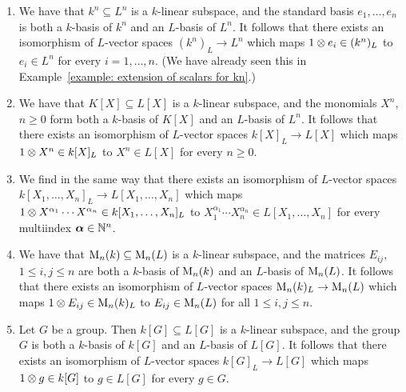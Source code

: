 \begin{example}
  \label{example: recognizing extension of scalar}
  \leavevmode
  \begin{enumerate}
    \item
      We have that $k^n \subseteq L^n$ is a $k$-linear subspace, and the standard basis $e_1, \dotsc, e_n$ is both a $k$-basis of $k^n$ and an $L$-basis of $L^n$.
      It follows that there exists an isomorphism of $L$-vector spaces $(k^n)_L \to L^n$ which maps $1 \mathbin{\otimes} e_i \in (k^n)_L$ to $e_i \in L^n$ for every $i = 1, \dotsc, n$.
      (We have already seen this in Example~\ref{example: extension of scalars for kn}.)
    \item
      We have that $K[X] \subseteq L[X]$ is a $k$-linear subspace, and the monomials $X^n$, $n \geq 0$ form both a $k$-basis of $K[X]$ and an $L$-basis of $L^n$.
      It follows that there exists an isomorphism of $L$-vector spaces $k[X]_L \to L[X]$ which maps $1 \mathbin{\otimes} X^n \in k[X]_L$ to $X^n \in L[X]$ for every $n \geq 0$.
    \item
      We find in the same way that there exists an isomorphism of $L$-vector spaces $k[X_1, \dotsc, X_n]_L \to L[X_1, \dotsc, X_n]$ which maps $1 \mathbin{\otimes} X^{\alpha_1} \dotsm X^{\alpha_n} \in k[X_1, \dotsc, X_n]_L$ to $X_1^{\alpha_1} \dotsm X_n^{\alpha_n} \in L[X_1, \dotsc, X_n]$ for every multiindex $\bm{\alpha} \in \mathbb{N}^n$.
    \item
      We have that $\operatorname{M}_n(k) \subseteq \operatorname{M}_n(L)$ is a $k$-linear subspace, and the matrices $E_{ij}$, $1 \leq i,j \leq n$ are both a $k$-basis of $\operatorname{M}_n(k)$ and an $L$-basis of $\operatorname{M}_n(L)$.
      It follows that there exists an isomorphism of $L$-vector spaces $\operatorname{M}_n(k)_L \to \operatorname{M}_n(L)$ which maps $1 \mathbin{\otimes} E_{ij} \in \operatorname{M}_n(k)_L$ to $E_{ij} \in \operatorname{M}_n(L)$ for all $1 \leq i,j \leq n$.
    \item
      Let $G$ be a group.
      Then $k[G] \subseteq L[G]$ is a $k$-linear subspace, and the group $G$ is both a $k$-basis of $k[G]$ and an $L$-basis of $L[G]$.
      It follows that there exists an isomorphism of $L$-vector spaces $k[G]_L \to L[G]$ which maps $1 \mathbin{\otimes} g \in k[G]$ to $g \in L[G]$ for every $g \in G$.
  \end{enumerate}
\end{example}


